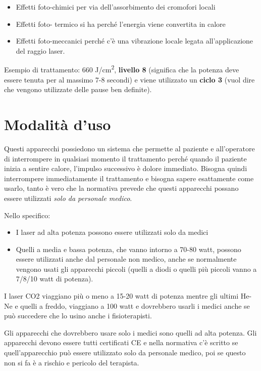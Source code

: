 \begin{itemize}
\item
  Effetti foto-chimici per via dell'assorbimento dei cromofori locali
\item
  Effetti foto- termico si ha perché l'energia viene convertita in
  calore
\item
  Effetti foto-meccanici perché c'è una vibrazione locale legata
  all'applicazione del raggio laser.
\end{itemize}

Esempio di trattamento: 660 J/cm\textsuperscript{2}, \textbf{livello 8} (significa che la
potenza deve essere tenuta per al massimo 7-8 secondi) e viene
utilizzato un \textbf{ciclo 3} (vuol dire che vengono utilizzate delle
pause ben definite).

\section{Modalità d'uso}

Questi apparecchi possiedono un sistema che permette al paziente e
all'operatore di interrompere in qualsiasi momento il trattamento perché
quando il paziente inizia a sentire calore, l'impulso successivo è
dolore immediato. Bisogna quindi interrompere immediatamente il
trattamento e bisogna sapere esattamente come usarlo, tanto è vero che
la normativa prevede che questi apparecchi possano essere utilizzati
\emph{solo da personale medico}.

Nello specifico:

\begin{itemize}
\item
  I laser ad alta potenza possono essere utilizzati solo da medici
\item
  Quelli a media e bassa potenza, che vanno intorno a 70-80 watt,
  possono essere utilizzati anche dal personale non medico, anche se
  normalmente vengono usati gli apparecchi piccoli (quelli a diodi o
  quelli più piccoli vanno a 7/8/10 watt di potenza).
\end{itemize}

I laser CO2 viaggiano più o meno a 15-20 watt di potenza mentre gli
ultimi He-Ne e quelli a freddo, viaggiano a 100 watt e dovrebbero usarli
i medici anche se può succedere che lo usino anche i fisioterapisti.

Gli apparecchi che dovrebbero usare solo i medici sono quelli ad alta
potenza. Gli apparecchi devono essere tutti certificati CE e nella
normativa c'è scritto se quell'apparecchio può essere utilizzato solo da
personale medico, poi se questo non si fa è a rischio e pericolo del
terapista.

